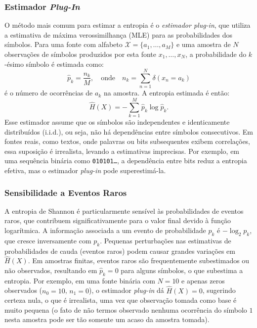 \subsubsection{Estimador \textit{Plug-In}}
O método mais comum para estimar a entropia é o \emph{estimador plug-in}, que
utiliza a estimativa de máxima verossimilhança (MLE) para as probabilidades dos
símbolos. Para uma fonte com alfabeto $\mathcal{X} = \{a_1, \ldots, a_M\}$
e uma amostra de $N$ observações de símbolos produzidos por esta fonte $x_1, \ldots, x_N$,
a probabilidade do $k$-ésimo símbolo é estimada como:
\begin{equation}
\hat{p}_k = \frac{n_k}{M}, \quad \text{onde} \quad n_k = \sum_{n=1}^N \delta(x_n = a_k)
\label{eq:mle-prob}
\end{equation}
é o número de ocorrências de $a_k$ na amostra. %
A entropia estimada é então:
\begin{equation}
\hat{H}(X) = -\sum_{k=1}^M \hat{p}_k \log \hat{p}_k.
\label{eq:estpluginentropia}
\end{equation}
Esse estimador assume que os símbolos são independentes e identicamente
distribuídos (i.i.d.), ou seja, não há dependências entre símbolos
consecutivos. Em fontes reais, como textos, onde palavras ou bits subsequentes
exibem correlações, essa suposição é irrealista, levando a estimativas
imprecisas. Por exemplo, em uma sequência binária como \texttt{010101\ldots}, a
dependência entre bits reduz a entropia efetiva, mas o estimador
\textit{plug-in} pode superestimá-la.





\subsubsection{Sensibilidade a Eventos Raros}
A entropia de Shannon é particularmente sensível às probabilidades de eventos
raros, que contribuem significativamente para o valor final devido à função
logarítmica. A informação associada a um evento de probabilidade $p_k$ é 
$-\log_2 p_k$, que cresce inversamente com $p_k$. Pequenas perturbações
nas estimativas de probabilidades de cauda (eventos raros) podem causar grandes
variações em $\hat{H}(X)$. Em amostras finitas, eventos raros são
frequentemente subestimados ou não observados, resultando em $\hat{p}_k = 0$
para alguns símbolos, o que subestima a entropia. Por exemplo, em uma fonte
binária com $N = 10$ e apenas zeros observados ($n_0 = 10$, $n_1 = 0$),
o estimador \textit{plug-in} dá $\hat{H}(X) = 0$, sugerindo certeza
nula, o que é irrealista, uma vez que observação tomada como base é muito
pequena (o fato de não termos observado nenhuma ocorrência do símbolo $1$
nesta amostra pode ser tão somente um acaso da amostra tomada).



